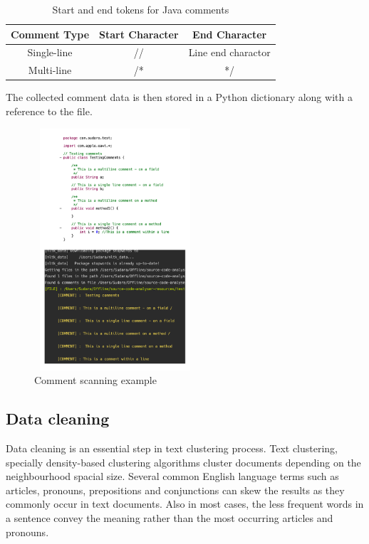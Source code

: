 \documentclass[conference]{IEEEtran}
\begin{document}
\begin{table}[!h]
\renewcommand{\arraystretch}{1.3}

\caption{Start and end tokens for Java comments}
\label{table_example}
\centering
\begin{tabular}{c|c|c}
\bfseries Comment Type & \bfseries Start Character & \bfseries End Character\\
\hline
Single-line & // & Line end charactor\\
\hline
Multi-line & /* & */
\end{tabular}
\end{table}

The collected comment data is then stored in a Python dictionary along with a reference to the file. 

\begin{figure}
\centerline{\includegraphics[width=6cm, height=9cm]{graphics/java-program_combined.png}}
\caption{Comment scanning example}
\label{fig}
\end{figure}

\subsection{Data cleaning}

Data cleaning is an essential step in text clustering process. Text clustering, specially density-based clustering algorithms cluster documents depending on the neighbourhood spacial size. Several common English language terms such as articles, pronouns, prepositions and conjunctions can skew the results as they commonly occur in text documents. Also in most cases, the less frequent words in a sentence convey the meaning rather than the most occurring articles and pronouns. 
\end{document}
